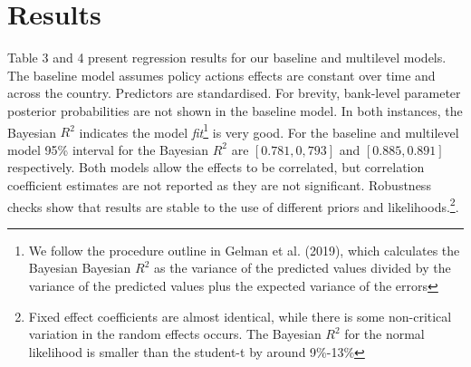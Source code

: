 \documentclass[
  10pt,
]{article}
\begin{document}
\hypertarget{results}{%
\section{Results}\label{results}}

Table 3 and 4 present regression results for our baseline and multilevel
models. The baseline model assumes policy actions effects are constant
over time and across the country. Predictors are standardised. For
brevity, bank-level parameter posterior probabilities are not shown in
the baseline model. In both instances, the Bayesian \(R^2\) indicates
the model \emph{fit}\footnote{We follow the procedure outline in Gelman
  et al. (2019), which calculates the Bayesian Bayesian \(R^2\) as the
  variance of the predicted values divided by the variance of the
  predicted values plus the expected variance of the errors} is very
good. For the baseline and multilevel model 95\% interval for the
Bayesian \(R^2\) are \([0.781,0,793]\) and \([0.885,0.891]\)
respectively. Both models allow the effects to be correlated, but
correlation coefficient estimates are not reported as they are not
significant. Robustness checks show that results are stable to the use
of different priors and likelihoods.\footnote{Fixed effect coefficients
  are almost identical, while there is some non-critical variation in
  the random effects occurs. The Bayesian \(R^2\) for the normal
  likelihood is smaller than the student-t by around 9\%-13\%}.
\end{document}
